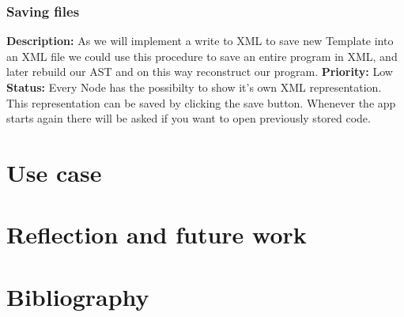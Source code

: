 \documentclass[a4paper,12pt]{report}
\begin{document}
\subsection{Saving files}
\textbf{Description: } As we will implement a write to XML to save new Template into an XML file we could use this procedure to save an entire program in XML, and later rebuild our AST and on this way 
reconstruct our program. \newline
\textbf{Priority:} Low \newline
\textbf{Status: } Every Node has the possibilty to show it's own XML representation. This representation can be saved by clicking the save button. Whenever the app starts again there will be asked if you want to open
previously stored code.


\chapter{Use case}

\chapter{Reflection and future work}
\chapter{Bibliography}
\end{document}
